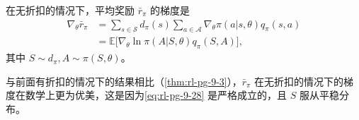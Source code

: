 \begin{theorem}
\label{thm:rl-pg-9-5}
在无折扣的情况下，平均奖励 $\bar{r}_{\pi}$ 的梯度是
\begin{equation}
\begin{aligned}
\nabla_{\theta} \bar{r}_{\pi} &= \sum_{s \in \mathcal{S}} d_{\pi}(s) \sum_{a \in \mathcal{A}} \nabla_{\theta} \pi(a|s,\theta) q_{\pi}(s,a) \\
&= \mathbb{E}\big[ \nabla_{\theta} \ln \pi(A|S,\theta) q_{\pi}(S,A) \big],
\end{aligned}
\label{eq:rl-pg-9-28}
\end{equation}
其中 $S \sim d_{\pi}, A \sim \pi(S,\theta)$。
\end{theorem}

与前面有折扣的情况下的结果相比（\cref{thm:rl-pg-9-3}），$\bar{r}_{\pi}$ 在无折扣的情况下的梯度在数学上更为优美，这是因为\cref{eq:rl-pg-9-28} 是严格成立的，且 $S$ 服从平稳分布。

